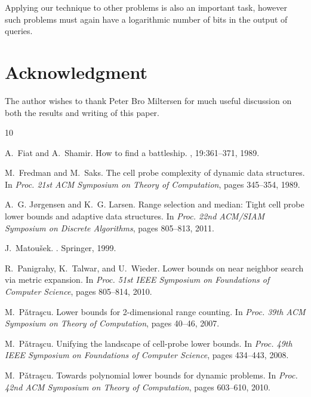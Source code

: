 \documentclass[letterpaper]{article}
\begin{document}
Applying our technique to other problems is also
an important task, however such problems must again have a logarithmic
number of bits in the output of queries.


\section{Acknowledgment}
The author wishes to thank Peter Bro Miltersen for much useful
discussion on both the results and writing of this paper.


\begin{thebibliography}{10}

A.~Fiat and A.~Shamir.
\newblock How to find a battleship.
, 19:361--371, 1989.

M.~Fredman and M.~Saks.
\newblock The cell probe complexity of dynamic data structures.
\newblock In {\em Proc. 21st ACM Symposium on Theory of Computation}, pages
  345--354, 1989.

A.~G. J{\o}rgensen and K.~G. Larsen.
\newblock Range selection and median: Tight cell probe lower bounds and
  adaptive data structures.
\newblock In {\em Proc. 22nd ACM/SIAM Symposium on Discrete Algorithms}, pages
  805--813, 2011.

J.~Matou{\v s}ek.
.
\newblock Springer, 1999.

R.~Panigrahy, K.~Talwar, and U.~Wieder.
\newblock Lower bounds on near neighbor search via metric expansion.
\newblock In {\em Proc. 51st IEEE Symposium on Foundations of Computer
  Science}, pages 805--814, 2010.

M.~P{\v a}tra{\c s}cu.
\newblock Lower bounds for 2-dimensional range counting.
\newblock In {\em Proc. 39th ACM Symposium on Theory of Computation}, pages
  40--46, 2007.

M.~P{\v a}tra{\c s}cu.
\newblock Unifying the landscape of cell-probe lower bounds.
\newblock In {\em Proc. 49th IEEE Symposium on Foundations of Computer
  Science}, pages 434--443, 2008.

M.~P{\v a}tra{\c s}cu.
\newblock Towards polynomial lower bounds for dynamic problems.
\newblock In {\em Proc. 42nd ACM Symposium on Theory of Computation}, pages
  603--610, 2010.


\end{thebibliography}
\end{document}
